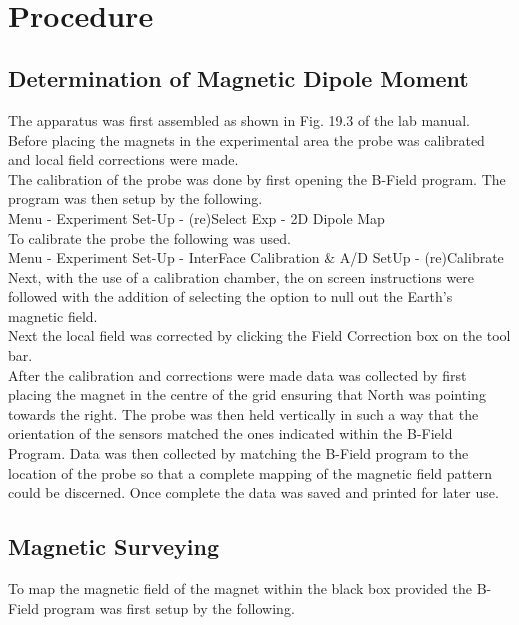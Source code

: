 \documentclass{article}
\begin{document}
\ 

\ 

\ 

\

\section{Procedure}
\subsection{Determination of Magnetic Dipole Moment}
The apparatus was first assembled as shown in Fig. 19.3 of the lab manual. Before placing the magnets in the experimental area the probe was calibrated and local field corrections were made.\\

The calibration of the probe was done by first opening the B-Field program. The program was then setup by the following.\\

Menu - Experiment Set-Up - (re)Select Exp - 2D Dipole Map\\

To calibrate the probe the following was used.\\

Menu - Experiment Set-Up - InterFace Calibration \& A/D SetUp - (re)Calibrate\\

Next, with the use of a calibration chamber, the on screen instructions were followed with the addition of selecting the option to null out the Earth's magnetic field.\\

Next the local field was corrected by clicking the Field Correction box on the tool bar.\\

After the calibration and corrections were made data was collected by first placing the magnet in the centre of the grid ensuring that North was pointing towards the right. The probe was then held vertically in such a way that the orientation of the sensors matched the ones indicated within the B-Field Program. Data was then collected by matching the B-Field program to the location of the probe so that a complete mapping of the magnetic field pattern could be discerned. Once complete the data was saved and printed for later use.

\subsection{Magnetic Surveying}
To map the magnetic field of the magnet within the black box provided the B-Field program was first setup by the following.\\
\end{document}
